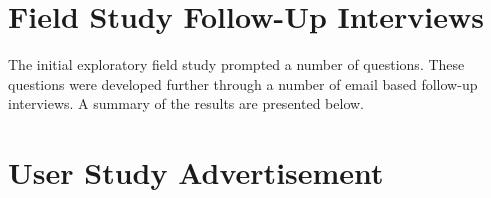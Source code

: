 \begin{center}
\end{center}

\chapter{Field Study Follow-Up Interviews}
\label{appendix:field-study-follow-up-interviews}

The initial exploratory field study prompted a number of questions. These questions were developed further through a number of email based follow-up interviews. A summary of the results are presented below.



\chapter{User Study Advertisement}
\label{appendix:user-study-advertisement}

